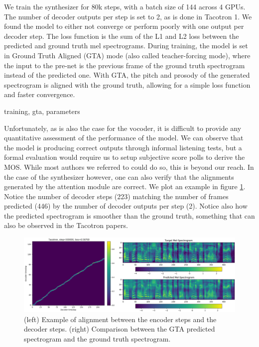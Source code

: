 \documentclass[a4paper, oneside, 12pt, english]{article}
\begin{document}
We train the synthesizer for 80k steps, with a batch size of 144 across 4 GPUs. The number of decoder outputs per step is set to 2, as is done in Tacotron 1. We found the model to either not converge or perform poorly with one output per decoder step. The loss function is the sum of the L1 and L2 loss between the predicted and ground truth mel spectrograms. During training, the model is set in Ground Truth Aligned (GTA) mode (also called teacher-forcing mode), where the input to the pre-net is the previous frame of the ground truth spectrogram instead of the predicted one. With GTA, the pitch and prosody of the generated spectrogram is aligned with the ground truth, allowing for a simple loss function and faster convergence.

\color{red} training, gta, parameters \color{black}

Unfortunately, as is also the case for the vocoder, it is difficult to provide any quantitative assessment of the performance of the model. We can observe that the model is producing correct outputs through informal listening tests, but a formal evaluation would require us to setup subjective score polls to derive the MOS. While most authors we referred to could do so, this is beyond our reach. In the case of the synthesizer however, one can also verify that the alignments generated by the attention module are correct. We plot an example in figure \ref{tacotron_alignment}. Notice the number of decoder steps (223) matching the number of frames predicted (446) by the number of decoder outputs per step (2). Notice also how the predicted spectrogram is smoother than the ground truth, something that can also be observed in the Tacotron papers.

\begin{figure}[h]
	\centering
	\includegraphics[width=\linewidth]{images/tacotron_alignment.png}
	\caption{(left) Example of alignment between the encoder steps and the decoder steps. (right) Comparison between the GTA predicted spectrogram and the ground truth spectrogram.}
	\label{tacotron_alignment}
\end{figure}
\end{document}
